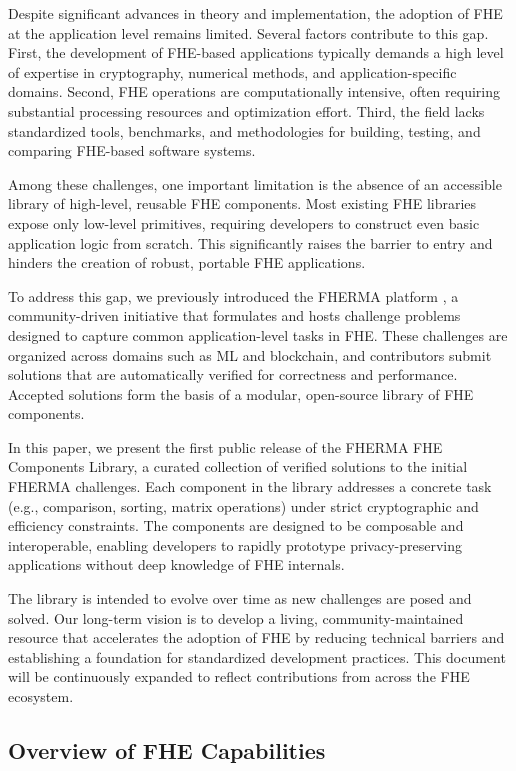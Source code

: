 \documentclass[article]{iacrtrans}
\begin{document}
Despite significant advances in theory and implementation, the adoption of FHE at the application level remains limited. Several factors contribute to this gap. First, the development of FHE-based applications typically demands a high level of expertise in cryptography, numerical methods, and application-specific domains. Second, FHE operations are computationally intensive, often requiring substantial processing resources and optimization effort. Third, the field lacks standardized tools, benchmarks, and methodologies for building, testing, and comparing FHE-based software systems.

Among these challenges, one important limitation is the absence of an accessible library of high-level, reusable FHE components. Most existing FHE libraries expose only low-level primitives, requiring developers to construct even basic application logic from scratch. This significantly raises the barrier to entry and hinders the creation of robust, portable FHE applications.

To address this gap, we previously introduced the FHERMA platform \cite{fherma:2024}, a community-driven initiative that formulates and hosts challenge problems designed to capture common application-level tasks in FHE. These challenges are organized across domains such as ML and blockchain, and contributors submit solutions that are automatically verified for correctness and performance. Accepted solutions form the basis of a modular, open-source library of FHE components.

In this paper, we present the first public release of the FHERMA FHE Components Library, a curated collection of verified solutions to the initial FHERMA challenges. Each component in the library addresses a concrete task (e.g., comparison, sorting, matrix operations) under strict cryptographic and efficiency constraints. The components are designed to be composable and interoperable, enabling developers to rapidly prototype privacy-preserving applications without deep knowledge of FHE internals.

The library is intended to evolve over time as new challenges are posed and solved. Our long-term vision is to develop a living, community-maintained resource that accelerates the adoption of FHE by reducing technical barriers and establishing a foundation for standardized development practices. This document will be continuously expanded to reflect contributions from across the FHE ecosystem.



\subsection{Overview of FHE Capabilities}
\end{document}
